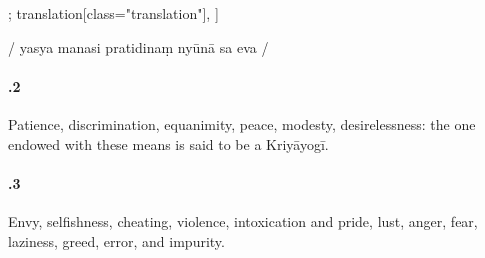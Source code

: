 \begin{alignment}[
  texts=edition[class="edition"];
  translation[class="translation"],
  ]
\begin{edition}
\begin{prose}[p02_02]
      /
      yasya manasi pratidinaṃ nyūnā
sa eva 
/
    \end{prose}
\end{edition}
\begin{translation}
\begin{tlate}[02_2]
  \paragraph{.2} Patience, discrimination, equanimity, peace, modesty, desirelessness: the one endowed with these means is said to be a Kriyāyogī.
  \end{tlate}
  \begin{tlate}[02_3]
    \paragraph{.3} Envy, selfishness, cheating, violence, intoxication and pride, lust, anger, fear, laziness, greed, error, and impurity.
  \end{tlate}
  \begin{tlate}[02_4]

\end{tlate}
\end{translation}
\end{alignment}
